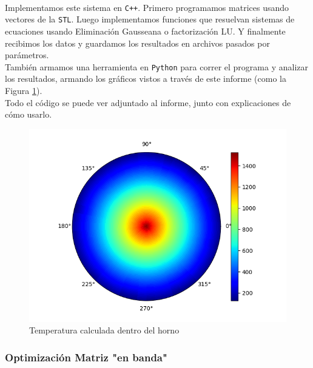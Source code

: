 \documentclass[12pt]{article}
\begin{document}
\paragraph{} Implementamos este sistema en \texttt{C++}. Primero programamos matrices usando vectores de la \texttt{STL}. Luego implementamos funciones que resuelvan sistemas de ecuaciones usando Eliminación Gausseana o factorización LU. Y finalmente recibimos los datos y guardamos los resultados en archivos pasados por parámetros. \\
También armamos una herramienta en \texttt{Python} para correr el programa y analizar los resultados, armando los gráficos vistos a través de este informe (como la Figura \ref{fig:temperature}). \\
Todo el código se puede ver adjuntado al informe, junto con explicaciones de cómo usarlo. \\

\begin{figure}[H]
\centering
\includegraphics[scale=0.5]{complete.0.temperature}
\caption{Temperatura calculada dentro del horno}
\label{fig:temperature}
\end{figure}

\subsubsection{Optimización Matriz "en banda"}
\end{document}
